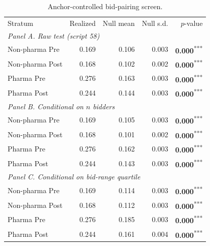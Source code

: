 \begin{table}[!htbp]
\centering
\begin{threeparttable}
\caption{Anchor-controlled bid-pairing screen.}
\label{tab:collusion_screen_anchor}
\small
\setlength{\tabcolsep}{6pt}
\providecommand{\sym}[1]{\textsuperscript{#1}}
\begin{tabular}{lrrrr}
\toprule
Stratum & Realized & Null mean & Null s.d. & $p$-value \\
\multicolumn{5}{l}{\emph{Panel A. Raw test (script 58)}} \\
\midrule
Non-pharma Pre & 0.169 & 0.106 & 0.003 & \textbf{0.000}\sym{***} \\
Non-pharma Post & 0.168 & 0.102 & 0.002 & \textbf{0.000}\sym{***} \\
Pharma Pre & 0.276 & 0.163 & 0.003 & \textbf{0.000}\sym{***} \\
Pharma Post & 0.244 & 0.144 & 0.003 & \textbf{0.000}\sym{***} \\
\multicolumn{5}{l}{\emph{Panel B. Conditional on $n$ bidders}} \\
\midrule
Non-pharma Pre & 0.169 & 0.105 & 0.003 & \textbf{0.000}\sym{***} \\
Non-pharma Post & 0.168 & 0.101 & 0.002 & \textbf{0.000}\sym{***} \\
Pharma Pre & 0.276 & 0.162 & 0.003 & \textbf{0.000}\sym{***} \\
Pharma Post & 0.244 & 0.143 & 0.003 & \textbf{0.000}\sym{***} \\
\multicolumn{5}{l}{\emph{Panel C. Conditional on bid-range quartile}} \\
\midrule
Non-pharma Pre & 0.169 & 0.114 & 0.003 & \textbf{0.000}\sym{***} \\
Non-pharma Post & 0.168 & 0.112 & 0.003 & \textbf{0.000}\sym{***} \\
Pharma Pre & 0.276 & 0.185 & 0.003 & \textbf{0.000}\sym{***} \\
Pharma Post & 0.244 & 0.161 & 0.004 & \textbf{0.000}\sym{***} \\
\bottomrule
\end{tabular}
\begin{tablenotes}[flushleft]\footnotesize

\end{tablenotes}
\end{threeparttable}
\end{table}
